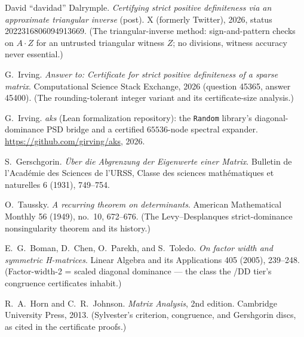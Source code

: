 
David ``davidad'' Dalrymple.
\emph{Certifying strict positive definiteness via an approximate
triangular inverse} (post). X (formerly Twitter), 2026, status
2022316806094913669. (The triangular-inverse method:
sign-and-pattern checks on $A \cdot Z$ for an untrusted triangular
witness $Z$; no divisions, witness accuracy never essential.)

G.~Irving.
\emph{Answer to: Certificate for strict positive definiteness of a
sparse matrix}.
Computational Science Stack Exchange, 2026 (question 45365, answer
45400). (The rounding-tolerant integer variant and its certificate-size
analysis.)

G.~Irving.
\emph{aks} (Lean formalization repository): the \texttt{Random}
library's diagonal-dominance PSD bridge and a certified
$65536$-node spectral expander.
\url{https://github.com/girving/aks}, 2026.

S.~Gerschgorin.
\emph{\"Uber die Abgrenzung der Eigenwerte einer Matrix}.
Bulletin de l'Acad\'emie des Sciences de l'URSS, Classe des sciences
math\'ematiques et naturelles 6 (1931), 749--754.

O.~Taussky.
\emph{A recurring theorem on determinants}.
American Mathematical Monthly 56 (1949), no.~10, 672--676. (The
Levy--Desplanques strict-dominance nonsingularity theorem and its
history.)

E.~G.~Boman, D.~Chen, O.~Parekh, and S.~Toledo.
\emph{On factor width and symmetric H-matrices}.
Linear Algebra and its Applications 405 (2005), 239--248.
(Factor-width-2 = scaled diagonal dominance --- the class the /DD
tier's congruence certificates inhabit.)

R.~A.~Horn and C.~R.~Johnson.
\emph{Matrix Analysis}, 2nd edition.
Cambridge University Press, 2013. (Sylvester's criterion, congruence,
and Gershgorin discs, as cited in the certificate proofs.)
